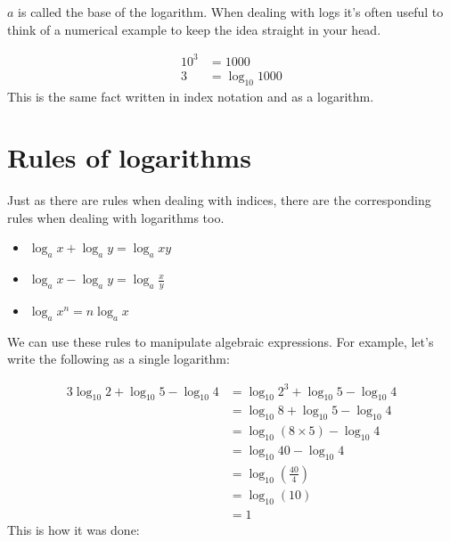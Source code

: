 \documentclass[
  a4paper,
]{scrbook}
\providecommand{\tightlist}{%
  \setlength{\itemsep}{0pt}\setlength{\parskip}{0pt}}
\begin{document}
\(a\) is called the base of the logarithm. When dealing with logs it's
often useful to think of a numerical example to keep the idea straight
in your head.

\[
\begin{aligned} 10^3 &= 1000 \\
3 &= \log_{10} 1000
\end{aligned}
\] This is the same fact written in index notation and as a logarithm.

\section{Rules of logarithms}\label{rules-of-logarithms}

Just as there are rules when dealing with indices, there are the
corresponding rules when dealing with logarithms too.

\begin{tcolorbox}[enhanced jigsaw, arc=.35mm, bottomrule=.15mm, bottomtitle=1mm, breakable, colback=white, colbacktitle=quarto-callout-note-color!10!white, colframe=quarto-callout-note-color-frame, coltitle=black, left=2mm, leftrule=.75mm, opacityback=0, opacitybacktitle=0.6, rightrule=.15mm, title=\textcolor{quarto-callout-note-color}{\faInfo}\hspace{0.5em}{Key point:}, titlerule=0mm, toprule=.15mm, toptitle=1mm]

\begin{itemize}
\tightlist
\item
  \(\log_{a} x + \log_{a} y = \log_{a} xy\)
\item
  \(\log_{a} x - \log_{a} y = \log_{a}{\frac{x}{y}}\)
\item
  \(\log_{a} x^n = n\log_{a} x\)
\end{itemize}

\end{tcolorbox}

We can use these rules to manipulate algebraic expressions. For example,
let's write the following as a single logarithm:

\[
\begin{aligned}
3\log_{10} 2 + \log_{10} 5 - \log_{10} 4 &= \log_{10} 2^3 + \log_{10} 5 -  \log_{10} 4 \\
&= \log_{10} 8 + \log_{10} 5 -  \log_{10} 4 \\
&= \log_{10} (8 \times 5)  -  \log_{10} 4 \\
&= \log_{10} 40  -  \log_{10} 4 \\
&= \log_{10} (\frac{40}{4}) \\
&= \log_{10} (10) \\
&= 1
\end{aligned}
\] This is how it was done:
\end{document}
